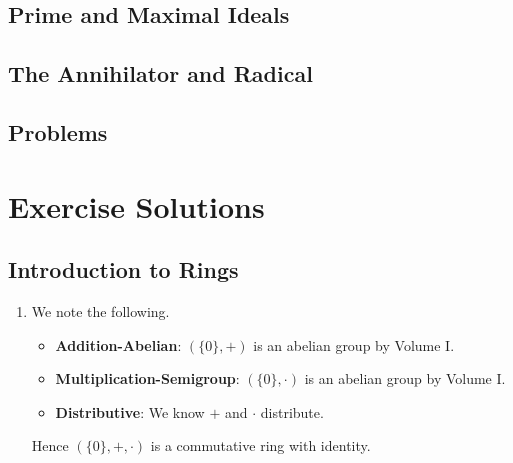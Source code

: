 \section{Prime and Maximal Ideals}
\section{The Annihilator and Radical}
\newpage
\section{Problems}

\appendix
\chapter{Exercise Solutions}
\section{Introduction to Rings}
\begin{enumerate}
    \item We note the following.
    \begin{itemize}
        \item \textbf{Addition-Abelian}: $(\{0\}, +)$ is an abelian group by Volume I.
        \item \textbf{Multiplication-Semigroup}: $(\{0\}, \cdot)$ is an abelian group by Volume I.
        \item \textbf{Distributive}: We know $+$ and $\cdot$ distribute.
    \end{itemize}
    Hence $(\{0\}, +, \cdot)$ is a commutative ring with identity.
\end{enumerate}

